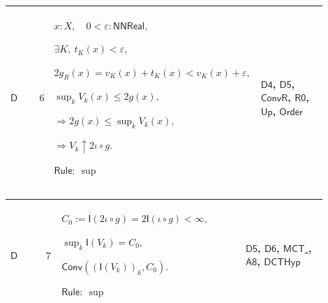 \documentclass[12pt,reqno]{amsart}
\theoremstyle{blueplain}
\numberwithin{equation}{section}
\begin{document}
{\scriptsize \setlength{\parskip}{0pt}\nointerlineskip
\noindent 
\begin{tabular}{|@{}>{\centering\arraybackslash}m{0.10658\linewidth}|>{\centering\arraybackslash}m{0.03553\linewidth}|>{\centering\arraybackslash}m{0.52105\linewidth}|>{\centering\arraybackslash}m{0.23684\linewidth}|}
\hline
\hypertarget{dct:D6}{$\displaystyle \mathsf{D}$} & $\displaystyle 6$ & $%
\displaystyle x:X,\quad0<\varepsilon:\mathsf{NNReal},$\par$\displaystyle %
\exists K,\ t_K(x)<\varepsilon,$\par$\displaystyle %
2g_R(x)=v_K(x)+t_K(x)<v_K(x)+\varepsilon,$\par$\displaystyle \sup_k
V_k(x)\le2g(x),$\par$\displaystyle \Rightarrow2g(x)\le\sup_kV_k(x),$\par$%
\displaystyle \Rightarrow V_k\uparrow2\iota\circ g.$\par$\displaystyle 
\mathsf{Rule}:\ \sup$ & \hyperlink{dct:D4}{$\displaystyle \mathsf{D4}$}, 
\hyperlink{dct:D5}{$\displaystyle \mathsf{D5}$}, \hyperlink{dctdef:ConvR}{$%
\displaystyle \mathsf{ConvR}$}, \hyperlink{dct:R0}{$\displaystyle \mathsf{R0}
$}, \hyperlink{def:Up}{$\displaystyle \mathsf{Up}$}, \hyperlink{ax:Order}{$%
\displaystyle \mathsf{Order}$} \\ \hline
\end{tabular}%
}

{\scriptsize \setlength{\parskip}{0pt}\nointerlineskip
\noindent 
\begin{tabular}{|@{}>{\centering\arraybackslash}m{0.10658\linewidth}|>{\centering\arraybackslash}m{0.03553\linewidth}|>{\centering\arraybackslash}m{0.52105\linewidth}|>{\centering\arraybackslash}m{0.23684\linewidth}|}
\hline
\hypertarget{dct:D7}{$\displaystyle \mathsf{D}$} & $\displaystyle 7$ & $%
\displaystyle C_0:=\mathsf{I}(2\iota\circ g)=2\mathsf{I}(\iota\circ
g)<\infty,$\par$\displaystyle \sup_k\mathsf{I}(V_k)=C_0,$\par$\displaystyle 
\mathsf{Conv}((\mathsf{I}(V_k))_k,C_0).$\par$\displaystyle \mathsf{Rule}:\
\sup$ & \hyperlink{dct:D5}{$\displaystyle \mathsf{D5}$}, \hyperlink{dct:D6}{$%
\displaystyle \mathsf{D6}$}, \hyperlink{lem:MCT}{$\displaystyle \mathsf{MCT}$%
}, \hyperlink{dct:A8}{$\displaystyle \mathsf{A8}$}, \hyperlink{dctdef:DCTHyp}%
{$\displaystyle \mathsf{DCTHyp}$} \\ \hline
\end{tabular}%
}
\end{document}
